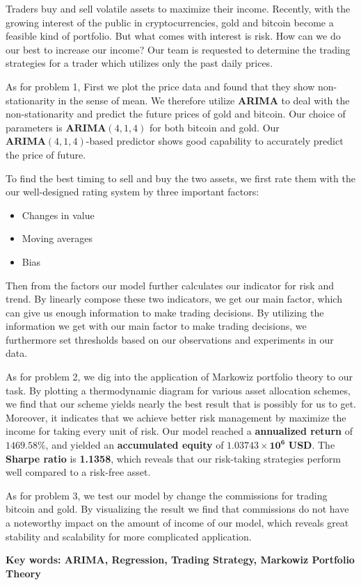 \documentclass[12pt,a4paper]{article}
\newcommand{\Predictor}{ARIMA }
\begin{document}
\begin{spacing}{1.2}   %



Traders buy and sell volatile assets to maximize their income. Recently, with the growing interest of the public in cryptocurrencies, gold and bitcoin become a feasible kind of portfolio. But what comes with interest is risk. How can we do our best to increase our income? Our team is requested to determine the trading strategies for a trader which utilizes only the past daily prices. 

As for problem 1, First we plot the price data and found that they show non-stationarity in the sense of mean. We therefore utilize \textbf{\Predictor} to deal with the non-stationarity and predict the future prices of gold and bitcoin. Our choice of parameters is $\mathbf{ARIMA}(4,1,4)$ for both bitcoin and gold. Our $\mathbf{ARIMA}(4,1,4)$-based predictor shows good capability to accurately predict the price of future.

To find the best timing to sell and buy the two assets, we first rate them with the our well-designed rating system by three important factors:

\begin{itemize}
	\item Changes in value
	\item Moving averages
	\item Bias
\end{itemize}
 

Then from the factors our model further calculates our indicator for risk and trend. By linearly compose these two indicators, we get our main factor, which can give us enough information to make trading decisions. By utilizing the information we get with our main factor to make trading decisions, we furthermore set thresholds based on our observations and experiments in our data. 

As for problem 2, we dig into the application of Markowiz portfolio theory to our task. By plotting a thermodynamic diagram for various asset allocation schemes, we find that our scheme yields nearly the best result that is possibly for us to get. Moreover, it indicates that we achieve better risk management by maximize the income for taking every unit of risk.
Our model reached a \textbf{annualized return} of $\mathbf{1469.58\%}$, and yielded an \textbf{accumulated equity} of $\mathbf{1.03743 \times 10^6}$ \textbf{USD}. The \textbf{Sharpe ratio} is \textbf{1.1358}, which reveals that our risk-taking strategies perform well compared to a risk-free asset.

As for problem 3, we test our model by change the commissions for trading bitcoin and gold. By visualizing the result we find that commissions do not have a noteworthy impact on the amount of income of our model, which reveals great stability and scalability for more complicated application.




\textbf{Key words: ARIMA, Regression, Trading Strategy, Markowiz Portfolio Theory} 

\end{spacing}
\end{document}
